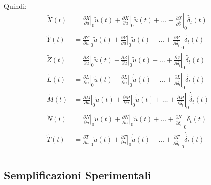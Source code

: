 Quindi:
\begin{equation*}
    \begin{split}
        \widetilde{X}(t) & = \left.\frac{\partial X}{\partial u}\right|_0\widetilde{u}(t) + \left.\frac{\partial X}{\partial \dot{u}}\right|_0\dot{\widetilde{u}}(t) + \dots + \left.\frac{\partial X}{\partial \dot{\delta_t}}\right|_0\dot{\widetilde{\delta_t}}(t) \\
        \widetilde{Y}(t) & = \left.\frac{\partial Y}{\partial u}\right|_0\widetilde{u}(t) + \left.\frac{\partial Y}{\partial \dot{u}}\right|_0\dot{\widetilde{u}}(t) + \dots + \left.\frac{\partial Y}{\partial \dot{\delta_t}}\right|_0\dot{\widetilde{\delta_t}}(t) \\
        \widetilde{Z}(t) & = \left.\frac{\partial Z}{\partial u}\right|_0\widetilde{u}(t) + \left.\frac{\partial Z}{\partial \dot{u}}\right|_0\dot{\widetilde{u}}(t) + \dots + \left.\frac{\partial Z}{\partial \dot{\delta_t}}\right|_0\dot{\widetilde{\delta_t}}(t) \\
        \widetilde{L}(t) & = \left.\frac{\partial L}{\partial u}\right|_0\widetilde{u}(t) + \left.\frac{\partial L}{\partial \dot{u}}\right|_0\dot{\widetilde{u}}(t) + \dots + \left.\frac{\partial L}{\partial \dot{\delta_t}}\right|_0\dot{\widetilde{\delta_t}}(t) \\
        \widetilde{M}(t) & = \left.\frac{\partial M}{\partial u}\right|_0\widetilde{u}(t) + \left.\frac{\partial M}{\partial \dot{u}}\right|_0\dot{\widetilde{u}}(t) + \dots + \left.\frac{\partial M}{\partial \dot{\delta_t}}\right|_0\dot{\widetilde{\delta_t}}(t) \\
        \widetilde{N}(t) & = \left.\frac{\partial N}{\partial u}\right|_0\widetilde{u}(t) + \left.\frac{\partial N}{\partial \dot{u}}\right|_0\dot{\widetilde{u}}(t) + \dots + \left.\frac{\partial N}{\partial \dot{\delta_t}}\right|_0\dot{\widetilde{\delta_t}}(t) \\
        \widetilde{T}(t) & = \left.\frac{\partial T}{\partial u}\right|_0\widetilde{u}(t) + \left.\frac{\partial T}{\partial \dot{u}}\right|_0\dot{\widetilde{u}}(t) + \dots + \left.\frac{\partial T}{\partial \dot{\delta_t}}\right|_0\dot{\widetilde{\delta_t}}(t) \\
    \end{split}
\end{equation*}

\subsection{Semplificazioni Sperimentali}

